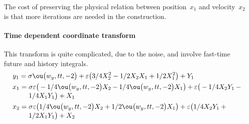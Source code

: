 The cost of preserving the physical relation between position~\(x_1\) and velocity~\(x_2\) is that more iterations are needed in the construction.




\paragraph{Time dependent coordinate transform}
This transform is quite complicated, due to the noise, and involve fast-time future and history integrals. 
\begin{align*}&
y_{1}=\sigma  \ou\big(w_{y},tt,-2\big)+\eps \big(3/4 X_{2}^{2}-1/2 X_{2}
 X_{1}+1/2 X_{1}^{2}\big)+Y_{1}
\\&
x_{1}=\ParMath{\sigma  \eps \big(-1/4 \ou\big(w_{y},tt,-2\big) X_{2}-1/4 \ou\big(
w_{y},tt,-2\big) X_{1}\big)+\eps \big(-1/4 X_{2} Y_{1}-1/4 X_{1} Y_{1}
\big)+X_{1}
}
\\&
x_{2}=\ParMath{\sigma  \eps \big(1/4 \ou\big(w_{y},tt,-2\big) X_{2}+1/2 \ou\big(w
_{y},tt,-2\big) X_{1}\big)+\eps \big(1/4 X_{2} Y_{1}+1/2 X_{1} Y_{1}
\big)+X_{2}
}
\end{align*}

